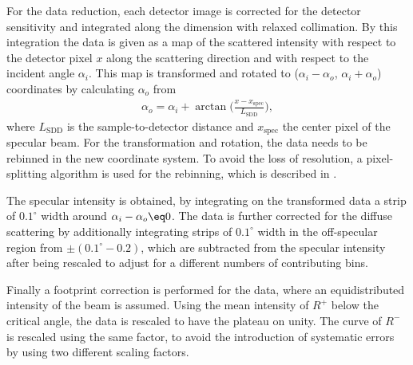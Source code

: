 \documentclass[\main/dresen_thesis.tex]{subfiles}
\begin{document}
    For the data reduction, each detector image is corrected for the detector sensitivity and integrated along the dimension with relaxed collimation.
    By this integration the data is given as a map of the scattered intensity with respect to the detector pixel $x$ along the scattering direction and with respect to the incident angle $\alpha_i$.
    This map is transformed and rotated to ($\alpha_i - \alpha_o$, $\alpha_i+\alpha_o$) coordinates by calculating $\alpha_o$ from
    \begin{align}
      \alpha_o = \alpha_i + \arctan \biggl( \frac{x - x_\mathrm{spec}}{L_\mathrm{SDD}} \biggr),
    \end{align}
    where $L_\mathrm{SDD}$ is the sample-to-detector distance and $x_\mathrm{spec}$ the center pixel of the specular beam.
    For the transformation and rotation, the data needs to be rebinned in the new coordinate system.
    To avoid the loss of resolution, a pixel-splitting algorithm is used for the rebinning, which is described in .

    The specular intensity is obtained, by integrating on the transformed data a strip of $0.1 ^\circ$ width around $\alpha_i - \alpha_o \eq 0$.
    The data is further corrected for the diffuse scattering by additionally integrating strips of $0.1 ^\circ$ width in the off-specular region from $\pm (0.1 ^\circ - 0.2)$, which are subtracted from the specular intensity after being rescaled to adjust for a different numbers of contributing bins.

    Finally a footprint correction is performed for the data, where an equidistributed intensity of the beam is assumed.
    Using the mean intensity of $R^{+}$ below the critical angle, the data is rescaled to have the plateau on unity.
    The curve of $R^{-}$ is rescaled using the same factor, to avoid the introduction of systematic errors by using two different scaling factors.
\end{document}
